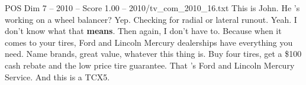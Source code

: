 \begin{textsample}{POS Dim 7 – 2010 – Score 1.00 – 2010/tv\_com\_2010\_16.txt}  \label{ex:f7_pos_074}
This is John.
He 's working on a wheel balancer?
Yep.
Checking for radial or lateral runout.
Yeah.
I don't know what that \textbf{means}.
Then again, I don't have to.
Because when it comes to your tires, Ford and Lincoln Mercury dealerships have everything you need.
Name brands, great value, whatever this thing is.
Buy four tires, get a \$100 cash rebate and the low price tire guarantee.
That 's Ford and Lincoln Mercury Service.
And this is a TCX5.

\end{textsample}
